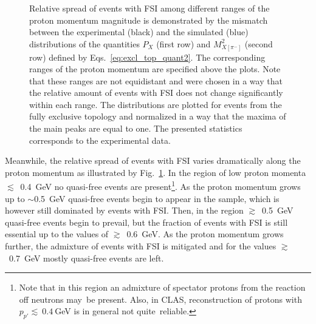 \begin{figure}[!ht]
\begin{center}
\end{center}
\caption{\small Relative spread of events with FSI among different ranges of the proton momentum magnitude is demonstrated by the mismatch between the experimental (black) and the simulated (blue) distributions of the quantities $P_{X}$ (first row) and $M^{2}_{X[\pi^{-}]}$ (second row) defined by Eqs.~\eqref{eq:excl_top_quant2}. The corresponding ranges of the proton momentum are specified above the plots. Note that these ranges are not equidistant and were chosen in a way that the relative amount of events with FSI does not change significantly within each range. The distributions are plotted for events from the fully exclusive topology and normalized in a way that the maxima of the main peaks are equal to one. The presented statistics corresponds to the experimental data.}
\label{fig:fsi_mom_dep_pr}
\end{figure}

Meanwhile, the relative spread of events with FSI varies dramatically along the proton momentum as illustrated by Fig.~\ref{fig:fsi_mom_dep_pr}. In the region of low proton momenta $\lesssim$~0.4~GeV no quasi-free events are present\footnote[6]{Note that in this region an admixture of spectator protons from the reaction off neutrons may~be present. Also, in CLAS, reconstruction of protons with $p_{p'}\lesssim~0.4~$GeV is in general not quite~reliable.}. As the proton momentum grows up to $\sim$0.5~GeV quasi-free events begin to appear in the sample, which is however still dominated by events with FSI. Then, in the region $\gtrsim$~0.5~GeV quasi-free events begin to prevail, but the fraction of events with FSI is still essential up to the values of $\gtrsim$~0.6~GeV. As the proton momentum grows further, the admixture of events with FSI is mitigated and for the values $\gtrsim$~0.7~GeV mostly quasi-free events are left.


